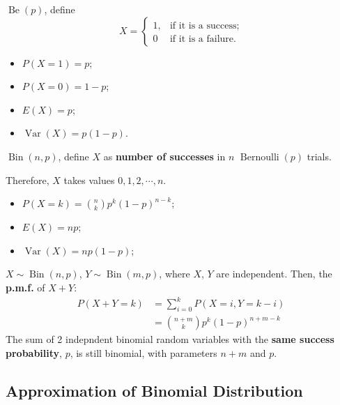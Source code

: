  \(\operatorname{Be}\left(p\right)\), define 
\begin{equation*}
  X = \begin{cases}1, &\text{if it is a success};\\ 
  0 &\text{if it is a failure.}\end{cases}
\end{equation*}
\begin{multicols}{2}
\begin{itemize}
\item \(P(X=1) = p\); 
\item \(P(X=0) = 1-p\);
\item \(E(X) = p\);
\item \(\operatorname{Var}\left(X\right)=p(1-p)\).
\end{itemize} 
\end{multicols}

 \(\operatorname{Bin}\left(n,p\right)\), define
\(X\) as \textbf{number of successes} in \(n\)
\(\operatorname{Bernoulli}\left(p\right)\) trials.

Therefore, \(X\) takes values \(0, 1, 2, \cdots, n\). 
\begin{itemize}
  \item \(P(X=k)=\binom{n}{k}p^k(1-p)^{n-k}\);
\end{itemize}
\begin{multicols}{2}
\begin{itemize}
  \item \(E(X)=np\);
  \item \(\operatorname{Var}\left(X\right)=np(1-p)\);
\end{itemize}
\end{multicols}

 \(X\sim
\operatorname{Bin}\left(n,p\right)\), \(Y\sim
\operatorname{Bin}\left(m,p\right)\), where \(X\), \(Y\) are independent. Then,
the \textbf{p.m.f.} of \(X + Y\):
\begin{align*}
  P(X + Y = k) &= \sum\limits_{i=0}^{k}P(X=i, Y = k-i) \\ 
               &= \binom{n+m}{k}p^k(1-p)^{n+m-k}
\end{align*}
The sum of 2 indepndent binomial random variables with the \textbf{same success
probability}, \(p\), is still binomial, with parameters \(n+m\) and \(p\).


\subsection{Approximation of Binomial Distribution}

